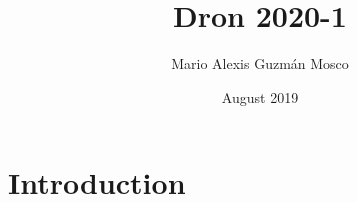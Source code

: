 \documentclass{article}
\title{Dron 2020-1}
\author{Mario Alexis Guzmán Mosco}
\date{August 2019}
\begin{document}
\maketitle

\section{Introduction}
\section{}
\end{document}
